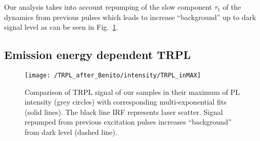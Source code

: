 Our analysis takes into account repumping of the slow component $\tau_1$ of the dynamics from previous pulses which leads to increase \enquote{background} up to dark signal level as can be seen in Fig.~\ref{fig:TRPL_int_all_max}.


\subsection{Emission energy dependent TRPL}
%


\begin{figure}[!ht]
	\centering
	\texttt{[image: /TRPL\_after\_Benito/intensity/TRPL\_inMAX]}
	\caption{Comparison of TRPL signal of our samples in their maximum of PL intensity (grey circles) with corresponding multi-exponential fits (solid lines). The black line IRF represents laser scatter. Signal repumped from previous excitation pulses increases \enquote{background} from dark level (dashed line).}
	\label{fig:TRPL_int_all_max}
\end{figure}


